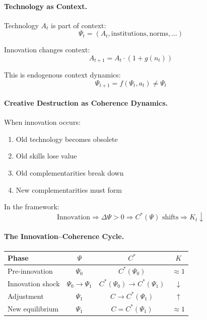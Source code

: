 \documentclass[12pt,a4paper]{article}
\begin{document}
\paragraph{Technology as Context.}
Technology $A_t$ is part of context:
\begin{equation}
  \Psi_t = (A_t, \text{institutions}, \text{norms}, \ldots)
\end{equation}

Innovation changes context:
\begin{equation}
  A_{t+1} = A_t \cdot (1 + g(n_t))
\end{equation}

This is endogenous context dynamics:
\begin{equation}
  \Psi_{t+1} = f(\Psi_t, a_t) \neq \Psi_t
\end{equation}

\paragraph{Creative Destruction as Coherence Dynamics.}
When innovation occurs:
\begin{enumerate}
  \item Old technology becomes obsolete
  \item Old skills lose value
  \item Old complementarities break down
  \item New complementarities must form
\end{enumerate}

In the framework:
\begin{equation}
  \text{Innovation} \Rightarrow \Delta \Psi > 0 \Rightarrow C^*(\Psi) \text{ shifts} \Rightarrow K_t \downarrow
\end{equation}

\paragraph{The Innovation--Coherence Cycle.}
\begin{center}
\renewcommand{\arraystretch}{1.2}
\begin{tabular}{lccc}
\hline
\textbf{Phase} & $\Psi$ & $C^*$ & $K$ \\
\hline
Pre-innovation & $\Psi_0$ & $C^*(\Psi_0)$ & $\approx 1$ \\
Innovation shock & $\Psi_0 \to \Psi_1$ & $C^*(\Psi_0) \to C^*(\Psi_1)$ & $\downarrow$ \\
Adjustment & $\Psi_1$ & $C \to C^*(\Psi_1)$ & $\uparrow$ \\
New equilibrium & $\Psi_1$ & $C = C^*(\Psi_1)$ & $\approx 1$ \\
\hline
\end{tabular}
\end{center}
\end{document}
